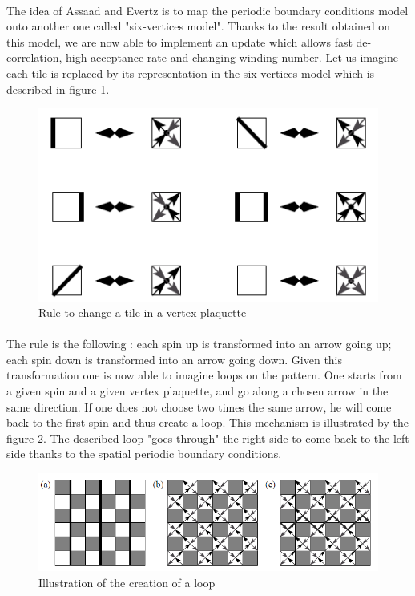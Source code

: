\documentclass[a4paper,12pt]{article}
\begin{document}
	\paragraph{}The idea of Assaad and Evertz is to map the periodic boundary conditions model onto another one called "six-vertices model". Thanks to the result obtained on this model, we are now able to implement an update which allows fast de-correlation, high acceptance rate and changing winding number.
	Let us imagine each tile is replaced by its representation in the six-vertices model which is described in figure \ref{six_vertex}.
	\begin{figure}[H]
		\centering
		\includegraphics[]{six_vertex.png}
		\caption{Rule to change a tile in a vertex plaquette}
		\label{six_vertex}
	\end{figure}

	\paragraph{} The rule is the following : each spin up is transformed into an arrow going up; each spin down is transformed into an arrow going down. 
	Given this transformation one is now able to imagine loops on the pattern. One starts from a given spin and a given vertex plaquette, and go along a chosen arrow in the same direction. If one does not choose two times the same arrow, he will come back to the first spin and thus create a loop. This mechanism is illustrated by the figure \ref{creating_loop}. The described loop "goes through" the right side to come back to the left side thanks to the spatial periodic boundary conditions.
	\begin{figure}[H]
		\centering
		\includegraphics[]{creating_loop.png}
		\caption{Illustration of the creation of a loop}
		\label{creating_loop}
	\end{figure}
\end{document}

